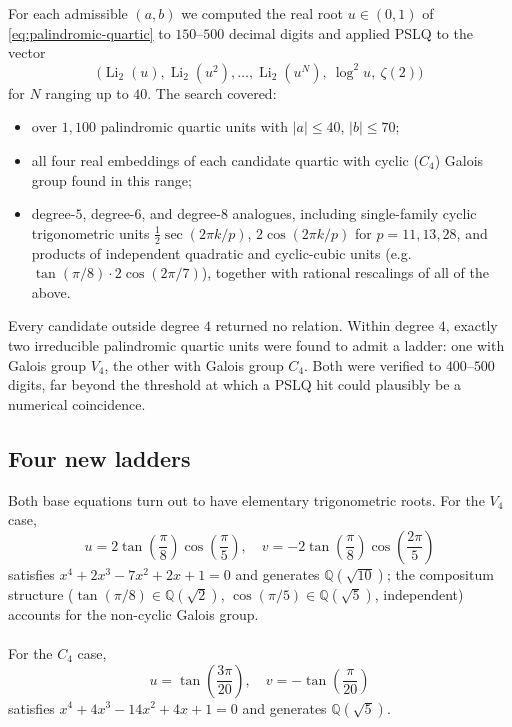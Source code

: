 \documentclass[12pt]{article}
\begin{document}
{For each admissible $(a,b)$ we computed the real root $u \in (0,1)$ of
\eqref{eq:palindromic-quartic} to $150$--$500$ decimal digits and applied
PSLQ to the vector
\begin{equation}
  \bigl(\operatorname{Li}_2(u), \operatorname{Li}_2(u^2), \ldots,
  \operatorname{Li}_2(u^N),\ \log^2 u,\ \zeta(2)\bigr)
\end{equation}
for $N$ ranging up to $40$. The search covered:
\begin{itemize}
  \item over $1{,}100$ palindromic quartic units with $|a| \le 40$,
    $|b|\le 70$;
  \item all four real embeddings of each candidate quartic with cyclic
    ($C_4$) Galois group found in this range;
  \item degree-$5$, degree-$6$, and degree-$8$ analogues, including
    single-family cyclic trigonometric units
    $\tfrac12\sec(2\pi k/p)$, $2\cos(2\pi k/p)$ for $p = 11, 13, 28$,
    and products of independent quadratic and cyclic-cubic units
    (e.g.\ $\tan(\pi/8)\cdot 2\cos(2\pi/7)$), together with rational
    rescalings of all of the above.
\end{itemize}
Every candidate outside degree $4$ returned no relation. Within degree
$4$, exactly two irreducible palindromic quartic units were found to
admit a ladder: one with Galois group $V_4$, the other with Galois
group $C_4$. Both were verified to $400$--$500$ digits, far beyond the
threshold at which a PSLQ hit could plausibly be a numerical
coincidence.

\subsection{Four new ladders}

Both base equations turn out to have elementary trigonometric roots.  For the $V_4$ case,
\begin{equation}
  u = 2\tan\!\left(\frac{\pi}  {8}\right)\cos\!\left(\frac{\pi}{5}\right), \quad v = -2\tan\!\left(\frac{\pi}  {8}\right)\cos\!\left(\frac{2\pi}{5}\right)
  \label{eq:u-sqrt10}
\end{equation}
satisfies $x^4+2x^3-7x^2+2x+1=0$ and generates $\mathbb{Q}(\sqrt{10})$;
the compositum structure ($\tan(\pi/8)\in\mathbb{Q}(\sqrt2)$,
$\cos(\pi/5)\in\mathbb{Q}(\sqrt5)$, independent) accounts for the
non-cyclic Galois group. 
\\
\\
For the $C_4$ case,
\begin{equation}
  u = \tan\!\left(\frac{3\pi}{20}\right), \quad  v=-\tan\!\left(\frac{\pi}{20}\right)
  \label{eq:u-sqrt5}
\end{equation}
satisfies $x^4+4x^3-14x^2+4x+1=0$ and generates $\mathbb{Q}(\sqrt5)$.



}
\end{document}
